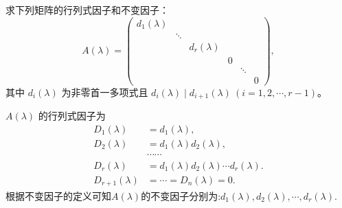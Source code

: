 \documentclass[../../main.tex]{subfiles}
\begin{document}
\begin{proposition}\label{proposition:相抵标准型的行列式因子和不变因子}
求下列矩阵的行列式因子和不变因子：
\[
A(\lambda)=\begin{pmatrix}
d_1(\lambda) & & & & \\
& \ddots & & & \\
& & d_r(\lambda) & & \\
& & & 0 & \\
& & & & \ddots & \\
& & & & & 0
\end{pmatrix},
\]
其中 $d_i(\lambda)$ 为非零首一多项式且 $d_i(\lambda)\mid d_{i + 1}(\lambda)\ (i = 1, 2, \cdots, r - 1)$。
\end{proposition}
\begin{solution}
$A(\lambda)$ 的行列式因子为
\begin{align*}
D_1(\lambda)&=d_1(\lambda),\\
D_2(\lambda)&=d_1(\lambda)d_2(\lambda),\\
&\cdots\cdots\\
D_r(\lambda)&=d_1(\lambda)d_2(\lambda)\cdots d_r(\lambda).
\\
D_{r+1}(\lambda)&=\cdots=D_n(\lambda)=0.
\end{align*}
根据不变因子的定义可知$A(\lambda)$的不变因子分别为:$d_1(\lambda),d_2(\lambda),\cdots,d_r(\lambda).$

\end{solution}
\end{document}
